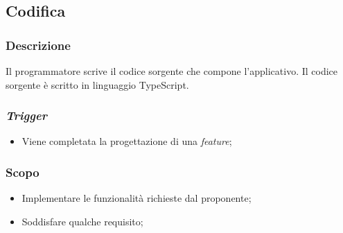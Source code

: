 \subsection{Codifica}
\label{codifica}

\subsubsection{Descrizione}

Il programmatore scrive il codice sorgente che compone l'applicativo. Il codice
sorgente è scritto in linguaggio TypeScript.

\subsubsection{\textit{Trigger}}
\begin{itemize}
	\item Viene completata la progettazione di una \textit{feature};
\end{itemize}

\subsubsection{Scopo}
\begin{itemize}
	\item Implementare le funzionalità richieste dal proponente;

	\item Soddisfare qualche requisito;
\end{itemize}

